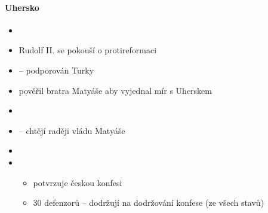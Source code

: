 \paragraph{Uhersko}
\begin{itemize}
\item {}
\item Rudolf II. se pokouší o protireformaci
\item {} -- podporován Turky
\item pověřil bratra Matyáše aby vyjednal mír s Uherskem
\item {}
\item {} -- chtějí raději vládu Matyáše
\item {}
\item {}
	\begin{itemize}
	\item potvrzuje českou konfesi
	\item 30 defenzorů -- dodržují na dodržování konfese (ze všech stavů)
	\end{itemize}
\end{itemize}






\timeline
